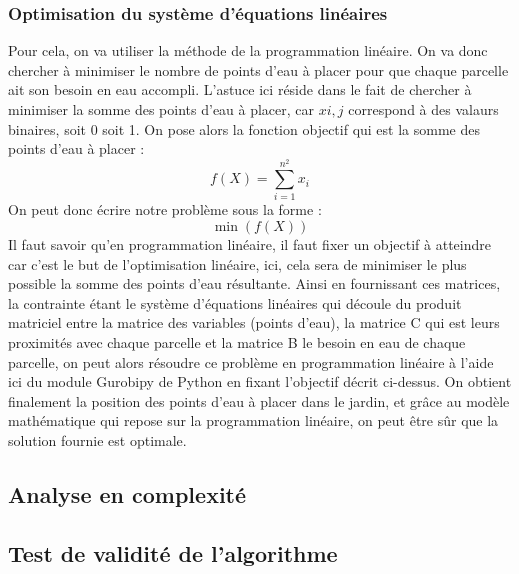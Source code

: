 \documentclass[french,a4paper]{article}
\begin{document}
\subsubsection{Optimisation du système d'équations linéaires}
\newline Pour cela, on va utiliser la méthode de la programmation linéaire. On va donc chercher à minimiser le nombre de points d'eau à placer pour que chaque parcelle ait son besoin en eau accompli. L'astuce ici réside dans le fait de chercher à minimiser la somme des points d'eau à placer, car $xi,j$ correspond à des valaurs binaires, soit 0 soit 1.
\newline On pose alors la fonction objectif qui est la somme des points d'eau à placer :
\newline
\newline \begin{equation} f(X) = \sum_{i=1}^{n^2} x_i \end{equation}
\newline
\newline On peut donc écrire notre problème sous la forme :
\newline
\newline \begin{equation} \min (f(X)) \end{equation}
\newline
\newline Il faut savoir qu'en programmation linéaire, il faut fixer un objectif à atteindre car c'est le but de l'optimisation linéaire, ici, cela sera de minimiser le plus possible la somme des points d'eau résultante.
\newline Ainsi en fournissant ces matrices, la contrainte étant le système d'équations linéaires qui découle du produit matriciel entre la matrice des variables (points d'eau), la matrice C qui est leurs proximités avec chaque parcelle et la matrice B le besoin en eau de chaque parcelle, on peut alors résoudre ce problème en programmation linéaire à l'aide ici du module Gurobipy de Python en fixant l'objectif décrit ci-dessus.
\newline On obtient finalement la position des points d'eau à placer dans le jardin, et grâce au modèle mathématique qui repose sur la programmation linéaire, on peut être sûr que la solution fournie est optimale.
\subsection{Analyse en complexité}
\subsection{Test de validité de l'algorithme}
\end{document}
